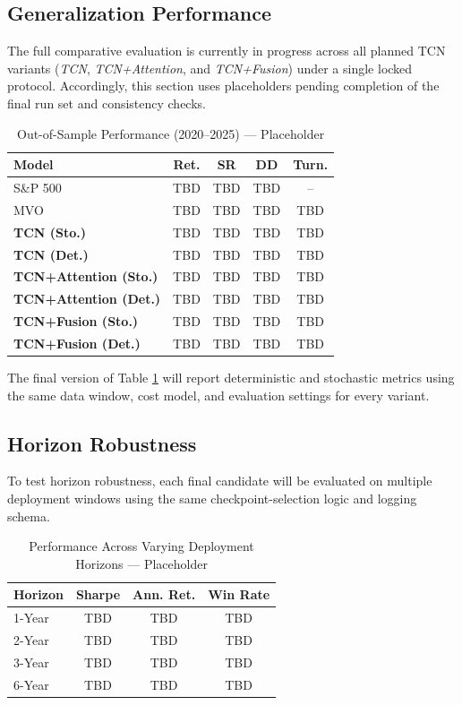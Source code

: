 \subsection{Generalization Performance}

The full comparative evaluation is currently in progress across all planned TCN variants (\textit{TCN}, \textit{TCN+Attention}, and \textit{TCN+Fusion}) under a single locked protocol.
Accordingly, this section uses placeholders pending completion of the final run set and consistency checks.

\begin{table}[!htbp]
\centering
\caption{Out-of-Sample Performance (2020--2025) --- Placeholder}
\label{tab:main_results}
\scriptsize
\begin{tabular}{@{}lcccc@{}}
\toprule
\textbf{Model} & \textbf{Ret.} & \textbf{SR} & \textbf{DD} & \textbf{Turn.} \\ \midrule
S\&P 500 & TBD & TBD & TBD & -- \\
MVO & TBD & TBD & TBD & TBD \\
\midrule
\textbf{TCN (Sto.)} & TBD & TBD & TBD & TBD \\
\textbf{TCN (Det.)} & TBD & TBD & TBD & TBD \\
\textbf{TCN+Attention (Sto.)} & TBD & TBD & TBD & TBD \\
\textbf{TCN+Attention (Det.)} & TBD & TBD & TBD & TBD \\
\textbf{TCN+Fusion (Sto.)} & TBD & TBD & TBD & TBD \\
\textbf{TCN+Fusion (Det.)} & TBD & TBD & TBD & TBD \\ \bottomrule
\end{tabular}
\end{table}

The final version of Table \ref{tab:main_results} will report deterministic and stochastic metrics using the same data window, cost model, and evaluation settings for every variant.

\FloatBarrier

\subsection{Horizon Robustness}

To test horizon robustness, each final candidate will be evaluated on multiple deployment windows using the same checkpoint-selection logic and logging schema.

\begin{table}[!htbp]
\centering
\caption{Performance Across Varying Deployment Horizons --- Placeholder}
\label{tab:horizon_results}
\small
\begin{tabular}{@{}lccc@{}}
\toprule
\textbf{Horizon} & \textbf{Sharpe} & \textbf{Ann. Ret.} & \textbf{Win Rate} \\ \midrule
1-Year & TBD & TBD & TBD \\
2-Year & TBD & TBD & TBD \\
3-Year & TBD & TBD & TBD \\
6-Year & TBD & TBD & TBD \\ \bottomrule
\end{tabular}
\end{table}

